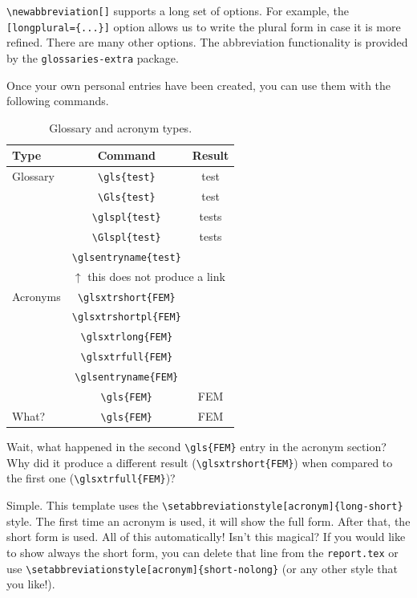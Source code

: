 \verb|\newabbreviation[]| supports a long set of options. For example, the \verb|[longplural={...}]| option allows us to write the plural form in case it is more refined. There are many other options. The abbreviation functionality is provided by the \verb|glossaries-extra| package.

Once your own personal entries have been created, you can use them with the following commands.

\begin{table}[h]
	\centering
	\begin{tabular}{lcc}
	  \toprule
	  Type & Command & Result \\
	  \midrule
	  Glossary & \verb|\gls{test}| & \gls{test} \\
		   & \verb|\Gls{test}| & \Gls{test} \\
		   & \verb|\glspl{test}| & \glspl{test} \\
		   & \verb|\Glspl{test}| & \Glspl{test} \\
		   & \verb|\glsentryname{test}| & \glsentryname{test} \\
		   & \multicolumn{2}{l}{$\uparrow$ this does not produce a link} \\
	  \cmidrule{2-3}
	  Acronyms & \verb|\glsxtrshort{FEM}| & \glsxtrshort{FEM} \\
		   & \verb|\glsxtrshortpl{FEM}| & \glsxtrshortpl{FEM} \\
		   & \verb|\glsxtrlong{FEM}| & \glsxtrlong{FEM} \\
		   & \verb|\glsxtrfull{FEM}| & \glsxtrfull{FEM} \\
		   & \verb|\glsentryname{FEM}| & \glsentryname{FEM} \\
	   & \verb|\gls{FEM}| & \gls{FEM} \\
	  What? & \verb|\gls{FEM}| & \gls{FEM} \\
	  \bottomrule
	\end{tabular}
	\caption{Glossary and acronym types.}
	\label{tab:glossaries}
\end{table}

\FloatBarrier

Wait, what happened in the second \verb|\gls{FEM}| entry in the acronym section? Why did it produce a different result (\verb|\glsxtrshort{FEM}|) when compared to the first one (\verb|\glsxtrfull{FEM}|)?

Simple. This template uses the \verb|\setabbreviationstyle[acronym]{long-short}| style. The first time an acronym is used, it will show the full form. After that, the short form is used. All of this automatically! Isn't this magical? If you would like to show always the short form, you can delete that line from the \texttt{report.tex} or use \verb|\setabbreviationstyle[acronym]{short-nolong}| (or any other style that you like!).

